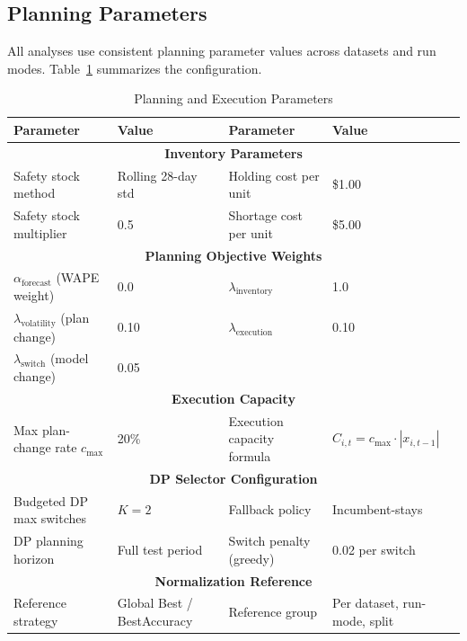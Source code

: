 

\subsection{Planning Parameters}

All analyses use consistent planning parameter values across datasets and run modes. Table~\ref{tab:planning-parameters} summarizes the configuration.

\begin{table}[htbp]
\centering
\caption{Planning and Execution Parameters}
\label{tab:planning-parameters}
\begin{tabular}{ll|ll}
\toprule
\textbf{Parameter} & \textbf{Value} & \textbf{Parameter} & \textbf{Value} \\
\midrule
\multicolumn{4}{c}{\textbf{Inventory Parameters}} \\
\midrule
Safety stock method & Rolling 28-day std & Holding cost per unit & \$1.00 \\
Safety stock multiplier & 0.5 & Shortage cost per unit & \$5.00 \\
\multicolumn{4}{c}{\textbf{Planning Objective Weights}} \\
\midrule
$\alpha_{\text{forecast}}$ (WAPE weight) & 0.0 & $\lambda_{\text{inventory}}$ & 1.0 \\
$\lambda_{\text{volatility}}$ (plan change) & 0.10 & $\lambda_{\text{execution}}$ & 0.10 \\
$\lambda_{\text{switch}}$ (model change) & 0.05 & & \\
\multicolumn{4}{c}{\textbf{Execution Capacity}} \\
\midrule
Max plan-change rate $c_{\max}$ & 20\% & Execution capacity formula & $C_{i,t} = c_{\max} \cdot |x_{i,t-1}|$ \\
\multicolumn{4}{c}{\textbf{DP Selector Configuration}} \\
\midrule
Budgeted DP max switches & $K=2$ & Fallback policy & Incumbent-stays \\
DP planning horizon & Full test period & Switch penalty (greedy) & 0.02 per switch \\
\multicolumn{4}{c}{\textbf{Normalization Reference}} \\
\midrule
Reference strategy & Global Best / BestAccuracy & Reference group & Per dataset, run-mode, split \\
\bottomrule
\end{tabular}
\end{table}

